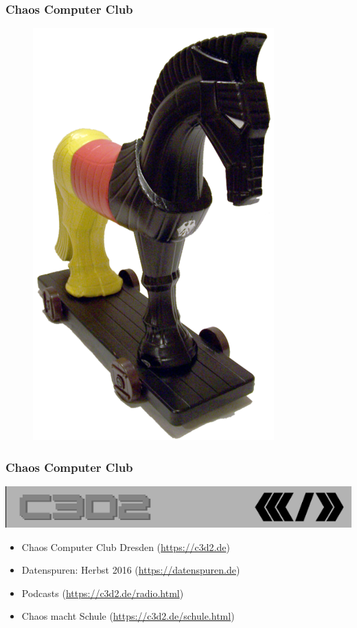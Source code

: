 \documentclass[12pt, xcolor={svgnames,table}]{beamer}
\begin{document}
\begin{frame}
  \frametitle{Chaos Computer Club}
  \begin{figure}
    \includegraphics[height=0.7\textheight]{img/trojaner.png}
  \end{figure}
\end{frame}

\begin{frame}
    \frametitle{Chaos Computer Club}
    \begin{center}
	\includegraphics[height=0.1\textheight]{img/c3d2_logo.png}
    \end{center}
    \begin{itemize}
      \item<1-> Chaos Computer Club Dresden (\url{https://c3d2.de})
      \item<2-> Datenspuren: Herbst 2016 (\url{https://datenspuren.de})
      \item<3-> Podcasts (\url{https://c3d2.de/radio.html})
      \item<4-> Chaos macht Schule (\url{https://c3d2.de/schule.html})
    \end{itemize}
\end{frame}
\end{document}
